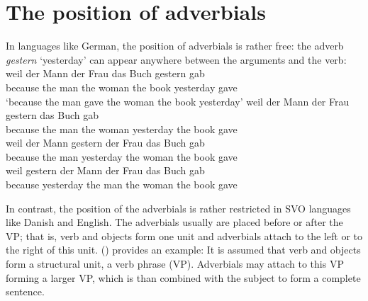 \section{The position of adverbials}


In languages like German, the position of adverbials is rather free: the adverb \emph{gestern}
`yesterday' can appear anywhere between the arguments and the verb:
\eal
\ex
\gll weil der Mann der Frau das Buch {gestern} gab\\ 
     because the man the woman the book yesterday gave\\
\glt `because the man gave the woman the book yesterday'
\ex 
\gll weil der Mann der Frau {gestern} das Buch gab\\
     because the man the woman yesterday the book gave\\
\ex 
\gll weil der Mann {gestern} der Frau das Buch gab\\
     because the man yesterday the woman the book gave\\
\ex 
\gll weil {gestern} der Mann der Frau das Buch gab\\
     because yesterday the man the woman the book gave\\
\zl

In contrast, the position of the adverbials is rather restricted in SVO languages like Danish and
English. The adverbials usually are placed before or after the VP; that is, verb and objects form one
unit and adverbials attach to the left or to the right of this unit. () provides an example:
\eal
{}
\zl
It is assumed that verb and objects form a structural unit, a verb phrase (VP). Adverbials may
attach to this VP forming a larger VP, which is than combined with the subject to form a complete sentence.

